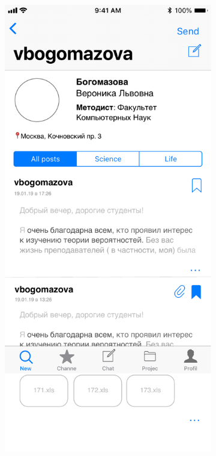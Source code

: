 \documentclass[a4paper,12pt]{article}
\begin{document}
	 \label{interface}
	\begin{figure}[h!]
		\centering
		\begin{subfigure}[b]{0.3\linewidth}
			\includegraphics[width=\linewidth]{../includes/prototype/1.pdf}

\end{subfigure}
\end{figure}
\end{document}
